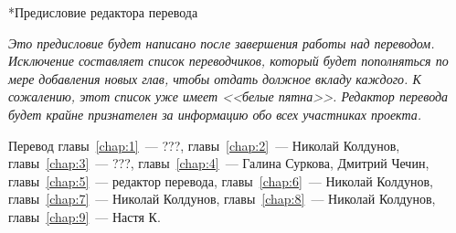 
\begin{chapter}*{Предисловие редактора перевода}

\textit{Это предисловие будет написано после завершения работы над переводом.
Исключение составляет список переводчиков, который будет пополняться
по мере добавления новых глав, чтобы отдать должное вкладу каждого.
К сожалению, этот список уже имеет <<белые пятна>>. Редактор
перевода будет крайне признателен за информацию обо всех участниках проекта.}

\bigskip 

Перевод главы~\ref{chap:1}~--- ???, главы~\ref{chap:2}~--- Николай Колдунов,
главы~\ref{chap:3}~--- ???, главы~\ref{chap:4}~--- Галина Суркова, 
Дмитрий Чечин, главы~\ref{chap:5}~--- редактор перевода, 
главы~\ref{chap:6}~--- Николай Колдунов, 
главы~\ref{chap:7}~--- Николай Колдунов,
главы~\ref{chap:8}~--- Николай Колдунов,
главы~\ref{chap:9}~--- Настя К.
\end{chapter}